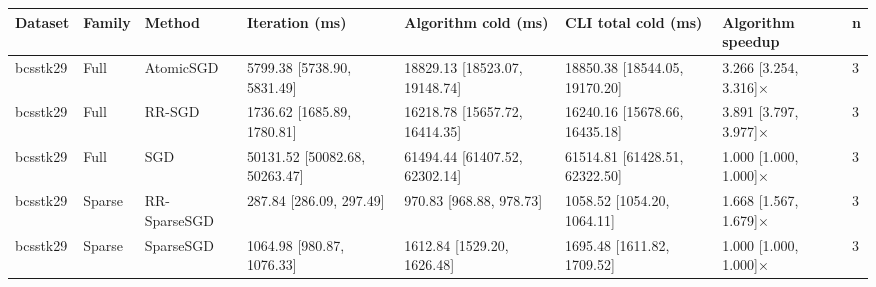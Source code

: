 \begin{tabular}{llllllll}
\hline
Dataset & Family & Method & Iteration (ms) & Algorithm cold (ms) & CLI total cold (ms) & Algorithm speedup & n \\
\hline
bcsstk29 & Full & AtomicSGD & 5799.38 [5738.90, 5831.49] & 18829.13 [18523.07, 19148.74] & 18850.38 [18544.05, 19170.20] & 3.266 [3.254, 3.316]× & 3 \\
bcsstk29 & Full & RR-SGD & 1736.62 [1685.89, 1780.81] & 16218.78 [15657.72, 16414.35] & 16240.16 [15678.66, 16435.18] & 3.891 [3.797, 3.977]× & 3 \\
bcsstk29 & Full & SGD & 50131.52 [50082.68, 50263.47] & 61494.44 [61407.52, 62302.14] & 61514.81 [61428.51, 62322.50] & 1.000 [1.000, 1.000]× & 3 \\
bcsstk29 & Sparse & RR-SparseSGD & 287.84 [286.09, 297.49] & 970.83 [968.88, 978.73] & 1058.52 [1054.20, 1064.11] & 1.668 [1.567, 1.679]× & 3 \\
bcsstk29 & Sparse & SparseSGD & 1064.98 [980.87, 1076.33] & 1612.84 [1529.20, 1626.48] & 1695.48 [1611.82, 1709.52] & 1.000 [1.000, 1.000]× & 3 \\
\hline
\end{tabular}
